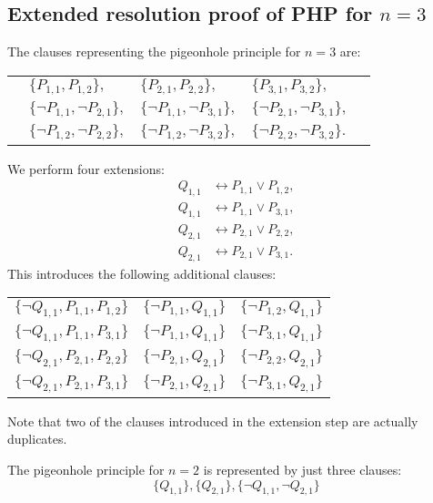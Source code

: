 \begin{appendices}

\section{Extended resolution proof of PHP for $n=3$}

The clauses representing the pigeonhole principle for $n=3$ are:

\begin{tabular}{rllll}
   & $\{P_{1,1}, P_{1,2}\},$ & $\{P_{2,1}, P_{2,2}\},$ & $\{P_{3,1}, P_{3,2}\},$ & \\
  & $\{\neg P_{1,1}, \neg P_{2,1}\},$ & $\{\neg P_{1,1}, \neg P_{3,1}\},$ & $\{\neg P_{2,1}, \neg P_{3,1}\},$ & \\
  & $\{\neg P_{1,2}, \neg P_{2,2}\},$ & $\{\neg P_{1,2}, \neg P_{3,2}\},$ & $\{\neg P_{2,2}, \neg P_{3,2}\}.$ &
\end{tabular}

We perform four extensions:
\begin{equation*}
  \begin{align*}
    Q_{1,1} &\leftrightarrow P_{1,1} \vee P_{1,2}, \\
    Q_{1,1} &\leftrightarrow P_{1,1} \vee P_{3,1}, \\
    Q_{2,1} &\leftrightarrow P_{2,1} \vee P_{2,2}, \\
    Q_{2,1} &\leftrightarrow P_{2,1} \vee P_{3,1}.
  \end{align*}
\end{equation*}
This introduces the following additional clauses:

\begin{tabular}{lll}
  $\{\neg Q_{1,1}, P_{1,1}, P_{1,2}\}$ &
  $\{\neg P_{1,1}, Q_{1,1}\}$ &
  $\{\neg P_{1,2}, Q_{1,1}\}$ \\
  $\{\neg Q_{1,1}, P_{1,1}, P_{3,1}\}$ &
  $\{\neg P_{1,1}, Q_{1,1}\}$ &
  $\{\neg P_{3,1}, Q_{1,1}\}$ \\
  $\{\neg Q_{2,1}, P_{2,1}, P_{2,2}\}$ &
  $\{\neg P_{2,1}, Q_{2,1}\}$ &
  $\{\neg P_{2,2}, Q_{2,1}\}$ \\
  $\{\neg Q_{2,1}, P_{2,1}, P_{3,1}\}$ &
  $\{\neg P_{2,1}, Q_{2,1}\}$ &
  $\{\neg P_{3,1}, Q_{2,1}\}$
\end{tabular}

Note that two of the clauses introduced in the extension step are actually duplicates.

The pigeonhole principle for $n=2$ is represented by just three clauses:
\[\{Q_{1,1}\}, \{Q_{2,1}\}, \{\neg Q_{1,1}, \neg Q_{2,1}\}\]


\end{appendices}
